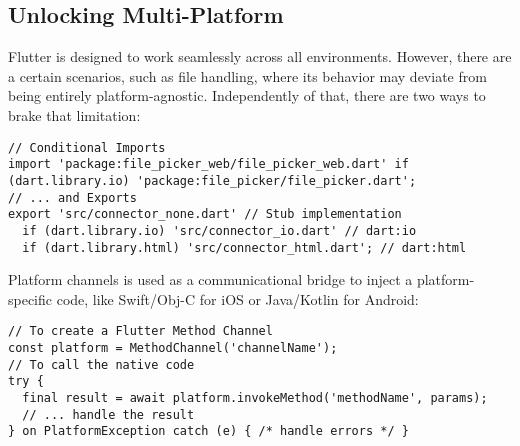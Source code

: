 
\newpage
\subsection{Unlocking Multi-Platform}

Flutter is designed to work seamlessly across all environments. However, there are a certain scenarios, such as file
handling, where its behavior may deviate from being entirely platform-agnostic. Independently of that, there are two
ways to brake that limitation:

\begin{lstlisting}
// Conditional Imports
import 'package:file_picker_web/file_picker_web.dart' if (dart.library.io) 'package:file_picker/file_picker.dart';
// ... and Exports
export 'src/connector_none.dart' // Stub implementation
  if (dart.library.io) 'src/connector_io.dart' // dart:io
  if (dart.library.html) 'src/connector_html.dart'; // dart:html
\end{lstlisting}

\noindent Platform channels is used as a communicational bridge to inject a platform-specific code, like Swift/Obj-C 
for iOS or Java/Kotlin for Android:

\begin{lstlisting}
// To create a Flutter Method Channel
const platform = MethodChannel('channelName');
// To call the native code
try {
  final result = await platform.invokeMethod('methodName', params);
  // ... handle the result
} on PlatformException catch (e) { /* handle errors */ }
\end{lstlisting}